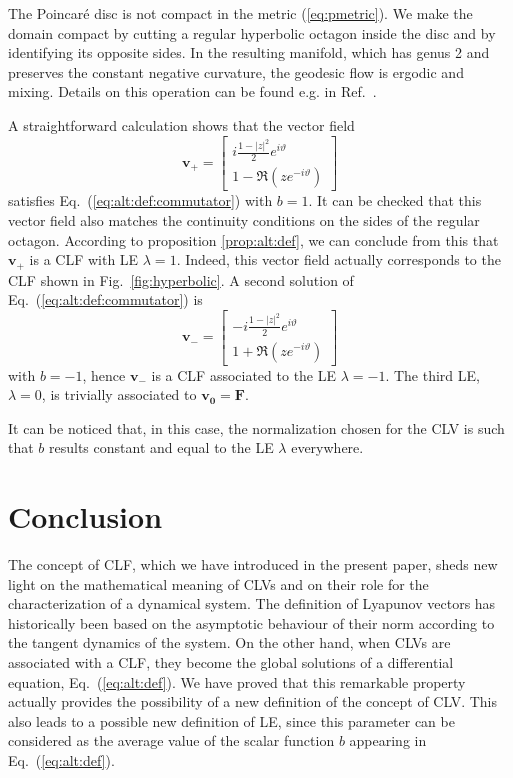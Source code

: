 \documentclass{article}
\theoremstyle{plain}
\theoremstyle{definition}
\theoremstyle{remark}
\newcommand{\vect}[1]{\boldsymbol{#1}}
\begin{document}
The Poincar\'e disc is not compact in the metric (\ref{eq:pmetric}). 
We make the domain compact by
cutting a regular hyperbolic octagon inside the disc and by identifying
its opposite sides. In the resulting manifold, which has genus 2 and preserves the
constant negative curvature, the geodesic flow is ergodic and
mixing. Details on this operation can be found e.g. in
Ref.~\cite{braun2002}.

A straightforward calculation shows that the vector field
\begin{equation}
  \vect{v_+} = \left[ \begin{array}{c}
      i \frac{1-\left|z\right|^2}{2} e^{i \vartheta}
      \\
      1 - \Re{\left(z e^{-i \vartheta}\right)}
  \end{array} \right]
\end{equation}
satisfies Eq.~(\ref{eq:alt:def:commutator}) with $b=1$. 
It can be checked that this vector field also matches
the continuity conditions on the sides of the regular
octagon. According to proposition \ref{prop:alt:def}, we can conclude
from this that $\vect{v_+}$ is a CLF with LE $\lambda =1$.
Indeed, this vector field actually corresponds to the CLF shown in
Fig.~\ref{fig:hyperbolic}.
A second solution of Eq.~(\ref{eq:alt:def:commutator}) is
\begin{equation}
  \vect{v_-} = \left[ \begin{array}{c}
      -i \frac{1-\left|z\right|^2}{2} e^{i \vartheta}
      \\
      1 + \Re{\left(z e^{-i \vartheta}\right)}
  \end{array} \right]
\end{equation}
with $b=-1$, hence $\vect{v_-}$ is a CLF
associated to the LE $\lambda=-1$. The third LE, $\lambda=0$,
is trivially associated to $\vect{v_0}=\vect{F}$.

It can be noticed that, in this case, the normalization chosen for the
CLV is such that $b$ results constant and equal to the LE $\lambda$
everywhere.


\section{Conclusion}

The concept of CLF, which we have introduced in the present paper,
sheds new light on the mathematical meaning of CLVs and on
their role for the characterization of a dynamical system. The
definition of Lyapunov vectors has historically been based on 
the asymptotic behaviour of their norm according
to the tangent dynamics of the system. On the other hand,
when CLVs are associated with a CLF,
they become the global solutions of a differential equation, 
Eq.~(\ref{eq:alt:def}). We have proved that
this remarkable property actually provides the
possibility of a new definition of the concept of CLV. This
also leads to a possible new definition of
LE, since this parameter can be considered as the average value of
the scalar function $b$ appearing in Eq.~(\ref{eq:alt:def}).
\end{document}

